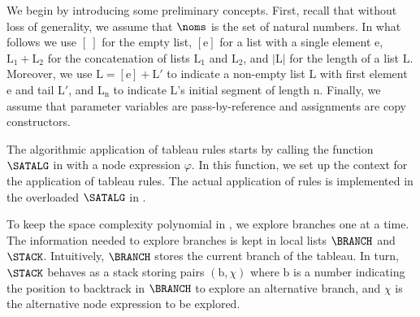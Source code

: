 \documentclass[10pt,a4paper]{amsart}
\theoremstyle{definition}
\theoremstyle{remark}
\begin{document}
We begin by introducing some preliminary concepts. 
First, recall that without loss of generality, we assume that $\noms$ is the set of natural numbers. 
In what follows we use
$[~]$ for the empty list,
$[\mathrm{e}]$ for a list with a single element $\mathrm{e}$,
$\mathrm{L}_1 + \mathrm{L}_2$ for the concatenation of lists $\mathrm{L}_1$ and $\mathrm{L}_2$,
and
$|\mathrm{L}|$ for the length %
of a list $\mathrm{L}$.
Moreover, we use $\mathrm{L} = [\mathrm{e}]+\mathrm{L}'$ to indicate a non-empty list $\mathrm{L}$ with first element $\mathrm{e}$ and tail $\mathrm{L}'$, and $\mathrm{L}_{\mathrm{n}}$ to indicate $\mathrm{L}$'s initial segment of length $\mathrm{n}$.
Finally, we assume that parameter variables are pass-by-reference and assignments are copy constructors.

The algorithmic application of tableau rules starts by calling the function $\SATALG$ in  with a node expression $\varphi$.
In this function, we set up the context for the application of tableau rules.
The actual application of rules is implemented in the overloaded $\SATALG$ in . %

To keep the space complexity polynomial in , we explore branches one at a time.
The information needed to explore branches is kept in local lists $\BRANCH$ and $\STACK$.
Intuitively, $\BRANCH$ stores the current branch of the tableau.
In turn, $\STACK$ behaves as a stack storing pairs $(\mathrm{b},\chi)$ where $\mathrm{b}$ is a number indicating the position to backtrack in $\BRANCH$ to explore an alternative branch, and $\chi$ is the alternative node expression to be explored.
\end{document}
